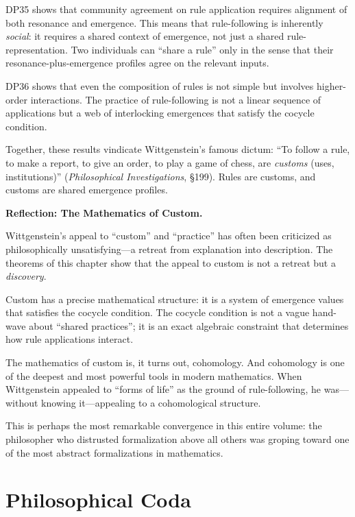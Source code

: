 DP35 shows that community agreement on rule application requires
alignment of both resonance and emergence.  This means that
rule-following is inherently \emph{social}: it requires a shared
context of emergence, not just a shared rule-representation.  Two
individuals can ``share a rule'' only in the sense that their
resonance-plus-emergence profiles agree on the relevant inputs.

DP36 shows that even the composition of rules is not simple but
involves higher-order interactions.  The practice of rule-following
is not a linear sequence of applications but a web of interlocking
emergences that satisfy the cocycle condition.

Together, these results vindicate Wittgenstein's famous dictum: ``To
follow a rule, to make a report, to give an order, to play a game of
chess, are \emph{customs} (uses, institutions)''
(\textit{Philosophical Investigations}, \S 199).  Rules are customs,
and customs are shared emergence profiles.

\begin{reflectionbox}
\noindent\textbf{Reflection: The Mathematics of Custom.}

Wittgenstein's appeal to ``custom'' and ``practice'' has often been
criticized as philosophically unsatisfying---a retreat from explanation
into description.  The theorems of this chapter show that the appeal
to custom is not a retreat but a \emph{discovery}.

Custom has a precise mathematical structure: it is a system of
emergence values that satisfies the cocycle condition.  The cocycle
condition is not a vague hand-wave about ``shared practices''; it is
an exact algebraic constraint that determines how rule applications
interact.

The mathematics of custom is, it turns out, cohomology.  And
cohomology is one of the deepest and most powerful tools in modern
mathematics.  When Wittgenstein appealed to ``forms of life'' as the
ground of rule-following, he was---without knowing it---appealing to
a cohomological structure.

This is perhaps the most remarkable convergence in this entire volume:
the philosopher who distrusted formalization above all others was
groping toward one of the most abstract formalizations in mathematics.
\end{reflectionbox}

\section{Philosophical Coda}

